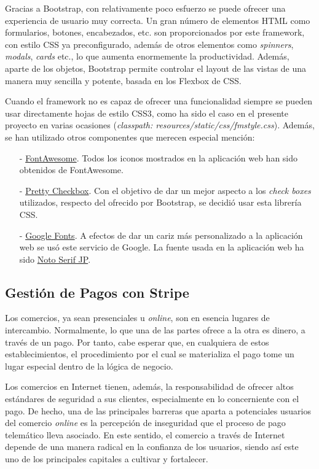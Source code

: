 \documentclass[a4paper]{article}
\begin{document}
    Gracias a Bootstrap, con relativamente poco esfuerzo se puede ofrecer una experiencia de usuario muy correcta. Un gran número de elementos HTML como formularios, botones, encabezados, etc. son proporcionados por este framework, con estilo CSS ya preconfigurado, además de otros elementos como \emph{spinners}, \emph{modals}, \emph{cards} etc., lo que aumenta enormemente la productividad.  Además, aparte de los objetos, Bootstrap permite controlar el layout de las vistas de una manera muy sencilla y potente, basada en los Flexbox de CSS.
    
    Cuando el framework no es capaz de ofrecer una funcionalidad siempre se pueden usar directamente hojas de estilo CSS3, como ha sido el caso en el presente proyecto en varias ocasiones (\emph{classpath: resources/static/css/fmstyle.css}). Además, se han utilizado otros componentes que merecen especial mención:
    
    \begin{itemize}
    	\item[-] \href{https://fontawesome.com/}{FontAwesome}. Todos los iconos mostrados en la aplicación web han sido obtenidos de FontAwesome.
    	\item[-] \href{https://lokesh-coder.github.io/pretty-checkbox/}{Pretty Checkbox}. Con el objetivo de dar un mejor aspecto a los \emph{check boxes} utilizados, respecto del ofrecido por Bootstrap, se decidió usar esta librería CSS.
    	\item[-] \href{https://fonts.google.com/}{Google Fonts}. A efectos de dar un cariz más personalizado a la aplicación web se usó este servicio de Google. La fuente usada en la aplicación web ha sido \href{https://fonts.google.com/specimen/Noto+Serif+JP}{Noto Serif JP}.
    \end{itemize}
    
    \subsection{Gestión de Pagos con Stripe} \label{sec:stripe}
    Los comercios, ya sean presenciales u \emph{online}, son en esencia lugares de intercambio. Normalmente, lo que una de las partes ofrece a la otra es dinero, a través de un pago. Por tanto, cabe esperar que, en cualquiera de estos establecimientos, el procedimiento por el cual se materializa el pago tome un lugar especial dentro de la lógica de negocio.
    
    Los comercios en Internet tienen, además, la responsabilidad de ofrecer altos estándares de seguridad a sus clientes, especialmente en lo concerniente con el pago. De hecho, una de las principales barreras que aparta a potenciales usuarios del comercio \emph{online} es la percepción de inseguridad que el proceso de pago telemático lleva asociado. En este sentido, el comercio a través de Internet depende de una manera radical en la confianza de los usuarios, siendo así este uno de los principales capitales a cultivar y fortalecer.
    
\end{document}
